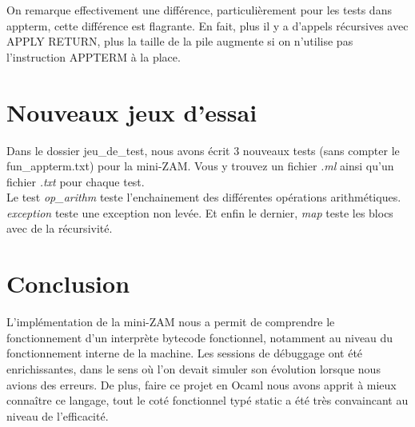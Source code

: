 \documentclass[11pt]{article}
\begin{document}
\vspace{0.5cm}
On remarque effectivement une différence, particulièrement pour les tests dans appterm, cette différence est flagrante. En fait, plus il y a d'appels récursives avec APPLY RETURN, plus la taille de la pile augmente si on n'utilise pas l'instruction APPTERM à la place.

\section{Nouveaux jeux d'essai }
Dans le dossier jeu\_de\_test, nous avons écrit 3 nouveaux tests (sans compter le fun\_appterm.txt) pour la mini-ZAM. Vous y trouvez un fichier {\em .ml} ainsi qu'un fichier {\em .txt} pour chaque test. \\
Le test {\em op\_arithm} teste l'enchainement des différentes opérations arithmétiques.
{\em exception} teste une exception non levée. Et enfin le dernier, {\em map} teste les blocs avec de la récursivité.

\section{Conclusion}
L'implémentation de la mini-ZAM nous a permit de comprendre le fonctionnement d'un interprète bytecode fonctionnel, notamment au niveau du fonctionnement interne de la machine. Les sessions de débuggage ont été enrichissantes, dans le sens où l'on devait simuler son évolution lorsque nous avions des erreurs. De plus, faire ce projet en Ocaml nous avons apprit à mieux connaître ce langage, tout le coté fonctionnel typé static a été très convaincant au niveau de l'efficacité.
\end{document}
